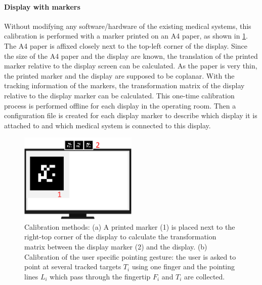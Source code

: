 \paragraph{Display with markers}
Without modifying any software/hardware of the existing medical systems, this calibration is performed with a marker printed on an A4 paper, as shown in  \figurename{\ref{fig:4-PointingOR:Calibration}}. 
The A4 paper is affixed closely next to the top-left corner of the display. Since the size of the A4 paper and the display are known, the translation of the printed marker relative to the display screen can be calculated. As the paper is very thin, the printed marker and the display are supposed to be coplanar. With the tracking information of the markers, the transformation matrix of the display relative to the display marker can be calculated. This one-time calibration process is performed offline for each display in the operating room. Then a configuration file is created for each display marker to describe which display it is attached to and which medical system is connected to this display. 
\begin{figure} [htb]
	\centering
	\includegraphics[width=0.5\textwidth]{figures/4-PointingOR/Calibration.png}
	\caption{Calibration methods: (a) A printed marker (1) is placed next to the right-top corner of the display to calculate the transformation matrix between the display marker (2) and the display. (b) Calibration of the user specific pointing gesture: the user is asked to point at several tracked targets $T_i$ using one finger and the pointing lines $L_i$ which pass through the fingertip $F_i$ and $T_i$ are collected.}
	\label{fig:4-PointingOR:Calibration}       %
\end{figure}
